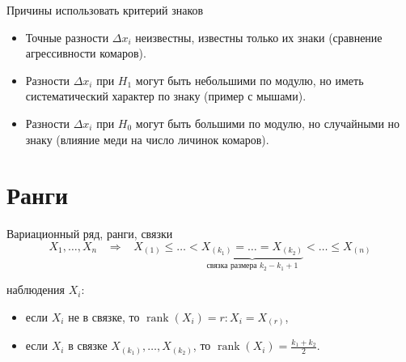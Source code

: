\documentclass[11pt,pdf,utf8,hyperref={unicode},aspectratio=169]{beamer}
\DeclareMathOperator{\rank}{rank}
\begin{document}
\begin{frame}{Причины использовать критерий знаков}
 \begin{itemize}
     \item Точные разности $\Delta x_i$ неизвестны, известны только их знаки (сравнение агрессивности комаров).
     \bigskip
     \item Разности $\Delta x_i$ при $H_1$ могут быть небольшими по модулю, но иметь систематический характер по знаку (пример с мышами).
     \bigskip
     \item Разности $\Delta x_i$ при $H_0$ могут быть большими по модулю, но случайными но знаку (влияние меди на число личинок комаров).
     \bigskip
 \end{itemize}
\end{frame}



\section{Ранги}
\begin{frame}{Вариационный ряд, ранги, связки}
 $$X_1,\ldots,X_n \;\;\; \Rightarrow \;\;\; X_{(1)}\leq\ldots < \underbrace{X_{(k_1)} = \ldots = X_{(k_2)}}_{\text{связка размера } k_2-k_1+1}<\ldots\leqslant  X_{(n)}$$

 \bigskip

  наблюдения $X_i$:
   \begin{itemize}
    \item если $X_i$ не в связке, то $\rank\left(X_i\right)=r\colon X_i=X_{(r)}$,
    \item если $X_i$ в связке $X_{(k_1)}, \ldots, X_{(k_2)}$, то $\rank\left(X_i\right)=\frac{k_1+k_2}{2}.$
   \end{itemize}
\end{frame}
\end{document}
